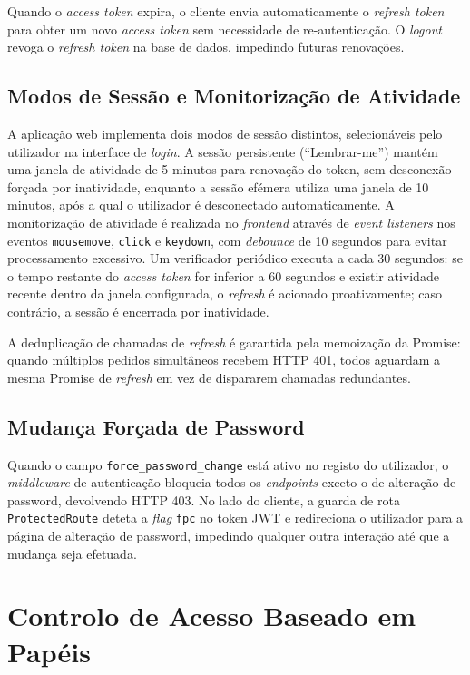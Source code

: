 \documentclass[12pt,a4paper]{report}
\begin{document}
Quando o \textit{access token} expira, o cliente envia automaticamente o \textit{refresh token} para obter um novo \textit{access token} sem necessidade de re-autenticação. O \textit{logout} revoga o \textit{refresh token} na base de dados, impedindo futuras renovações.

\subsection{Modos de Sessão e Monitorização de Atividade}

A aplicação web implementa dois modos de sessão distintos, selecionáveis pelo utilizador na interface de \textit{login}. A sessão persistente (``Lembrar-me'') mantém uma janela de atividade de 5 minutos para renovação do token, sem desconexão forçada por inatividade, enquanto a sessão efémera utiliza uma janela de 10 minutos, após a qual o utilizador é desconectado automaticamente. A monitorização de atividade é realizada no \textit{frontend} através de \textit{event listeners} nos eventos \texttt{mousemove}, \texttt{click} e \texttt{keydown}, com \textit{debounce} de 10 segundos para evitar processamento excessivo. Um verificador periódico executa a cada 30 segundos: se o tempo restante do \textit{access token} for inferior a 60 segundos e existir atividade recente dentro da janela configurada, o \textit{refresh} é acionado proativamente; caso contrário, a sessão é encerrada por inatividade.

A deduplicação de chamadas de \textit{refresh} é garantida pela memoização da Promise: quando múltiplos pedidos simultâneos recebem HTTP 401, todos aguardam a mesma Promise de \textit{refresh} em vez de dispararem chamadas redundantes.

\subsection{Mudança Forçada de Password}

Quando o campo \texttt{force\_password\_change} está ativo no registo do utilizador, o \textit{middleware} de autenticação bloqueia todos os \textit{endpoints} exceto o de alteração de password, devolvendo HTTP 403. No lado do cliente, a guarda de rota \texttt{ProtectedRoute} deteta a \textit{flag} \texttt{fpc} no token JWT e redireciona o utilizador para a página de alteração de password, impedindo qualquer outra interação até que a mudança seja efetuada.

\section{Controlo de Acesso Baseado em Papéis}
\end{document}
